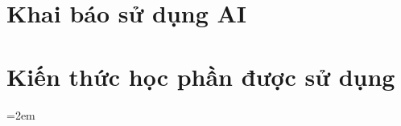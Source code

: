 \documentclass[11pt,a4paper]{article}
\begin{document}
\section{Khai báo sử dụng AI}\label{sec:ai}


\clearpage
\appendix
\section{Kiến thức học phần được sử dụng}\label{app:chapters}


\clearpage
{}
\begingroup\emergencystretch=2em               %
\printbibliography[heading=bibintoc,title={Tài liệu tham khảo}]
\endgroup
\end{document}
